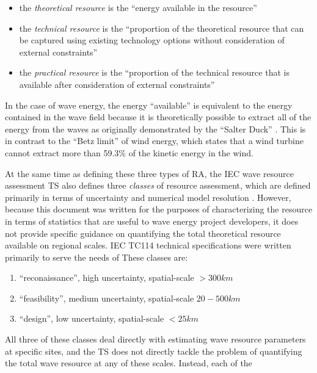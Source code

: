 \begin{itemize}
  \item the {\it theoretical resource} is the ``energy available in the resource''
  \item the {\it technical resource} is the ``proportion of the theoretical resource that can be captured using existing technology options without consideration of external constraints''
  \item the {\it practical resource} is the ``proportion of the technical resource that is available after consideration of external constraints''
  \end{itemize}

In the case of wave energy, the energy ``available'' is equivalent to the energy contained in the wave field because it is theoretically possible to extract all of the energy from the waves as originally demonstrated by the ``Salter Duck'' \citep{salterRecentProgressDucks1980}. This is in contrast to the ``Betz limit'' of wind energy, which states that a wind turbine cannot extract more than 59.3\% of the kinetic energy in the wind. 

At the same time as defining these three types of RA, the IEC wave resource assessment TS also defines three {\em classes} of resource assessment, which are defined primarily in terms of uncertainty and numerical model resolution \citep{internationalelectrotechnicalcommissionPart101Wave2015}. However, because this document was written for the purposes of characterizing the resource in terms of statistics that are useful to wave energy project developers, it does not provide specific guidance on quantifying the total theoretical resource available on regional scales. 
IEC TC114 technical specifications were written primarily to serve the needs of  These classes are:
\begin{enumerate}
\item ``reconaissance'', high uncertainty, spatial-scale $>300 km$
\item ``feasibility'', medium uncertainty, spatial-scale $20- 500 km$
\item ``design'', low uncertainty, spatial-scale $<25 km$
\end{enumerate}
All three of these classes deal directly with estimating wave resource parameters at specific sites, and the TS does not directly tackle the problem of quantifying the total wave resource at any of these scales. Instead, each of the 

  
